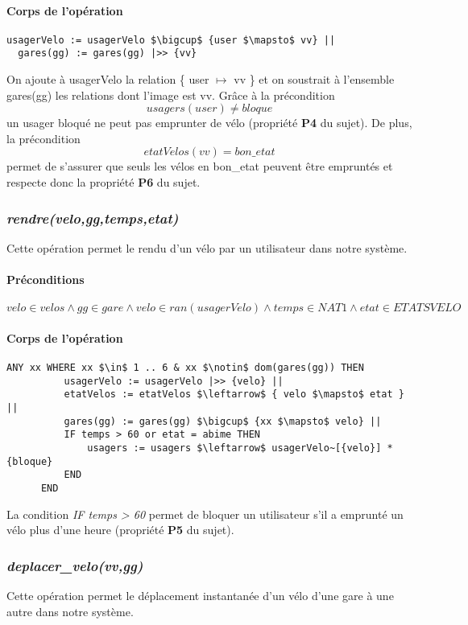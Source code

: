 \documentclass[12pt]{article}
\begin{document}
\paragraph{Corps de l'opération}
\textbf{}
\begin{lstlisting}[mathescape]
  usagerVelo := usagerVelo $\bigcup$ {user $\mapsto$ vv} ||
  gares(gg) := gares(gg) |>> {vv}
\end{lstlisting}

On ajoute à usagerVelo la relation \{ user $\mapsto$ vv \} et on soustrait à l'ensemble gares(gg) les relations dont l'image est vv. Grâce à la précondition \[ usagers(user) \neq bloque \] un usager bloqué ne peut pas emprunter de vélo (propriété \textbf{P4} du sujet). De plus, la précondition \[etatVelos(vv) = bon\_etat\] permet de s'assurer que seuls les vélos en bon\_etat peuvent être empruntés et respecte donc la propriété \textbf{P6} du sujet.
\subsubsection{\textit{rendre(velo,gg,temps,etat)}}
Cette opération permet le rendu d'un vélo par un utilisateur dans notre système.
\paragraph{Préconditions}
\[ velo \in velos \land gg \in gare \land velo \in ran(usagerVelo) \land temps \in NAT1 \land etat \in ETATSVELO\]

\paragraph{Corps de l'opération}
\textbf{}
\begin{lstlisting}[mathescape]
      ANY xx WHERE xx $\in$ 1 .. 6 & xx $\notin$ dom(gares(gg)) THEN
          usagerVelo := usagerVelo |>> {velo} ||
          etatVelos := etatVelos $\leftarrow$ { velo $\mapsto$ etat } ||
          gares(gg) := gares(gg) $\bigcup$ {xx $\mapsto$ velo} ||
          IF temps > 60 or etat = abime THEN
              usagers := usagers $\leftarrow$ usagerVelo~[{velo}] * {bloque}
          END
      END
\end{lstlisting}
La condition \textit{IF temps > 60} permet de bloquer un utilisateur s'il a emprunté un vélo plus d'une heure (propriété \textbf{P5} du sujet).
\subsubsection{\textit{deplacer\_velo(vv,gg)}}
Cette opération permet le déplacement instantanée d'un vélo d'une gare à une autre dans notre système.
\end{document}
